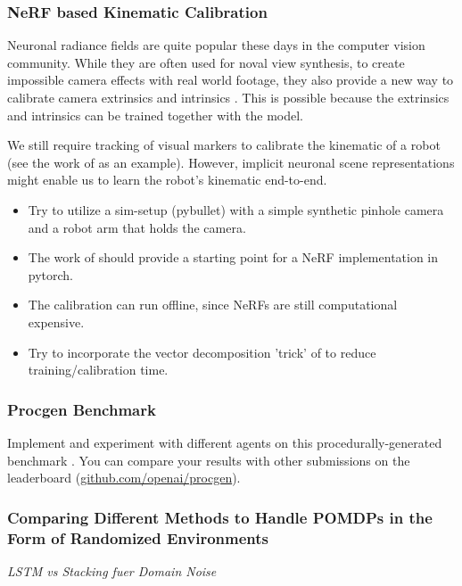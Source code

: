 \documentclass[a4paper]{article}
\begin{document}
\subsubsection{NeRF based Kinematic Calibration}
Neuronal radiance fields are quite popular these days in the computer vision community. While they are often used for noval view synthesis, to create impossible camera effects with real world footage, they also provide a new way to calibrate camera extrinsics and intrinsics \cite{lin2021barf, Sucar:etal:ICCV2021, wang2021nerfmm, SCNeRF2021}.
This is possible because the extrinsics and intrinsics can be trained together with the model.

We still require tracking of visual markers to calibrate the kinematic of a robot (see the work of \cite{Birbach2014} as an example).
However, implicit neuronal scene representations might enable us to learn the robot's kinematic end-to-end.

\begin{itemize}
  \item Try to utilize a sim-setup (pybullet) with a simple synthetic pinhole camera and a robot arm that holds the camera.
  \item The work of \cite{SCNeRF2021} should provide a starting point for a NeRF implementation in pytorch.
  \item The calibration can run offline, since NeRFs are still computational expensive.
  \item Try to incorporate the vector decomposition 'trick' of \cite{TensoRF} to reduce training/calibration time.
\end{itemize}





\subsubsection{Procgen Benchmark}
Implement and experiment with different agents on this procedurally-generated benchmark \cite{procgen2020}.
You can compare your results with other submissions on the leaderboard (\url{github.com/openai/procgen}).

\subsubsection{Comparing Different Methods to Handle POMDPs in the Form of Randomized Environments}
\textit{LSTM vs Stacking fuer Domain Noise}
\end{document}
